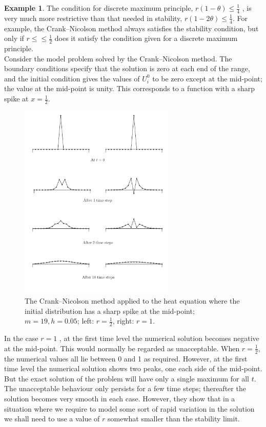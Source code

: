 \documentclass[a4paper,twoside]{ctexart}
\theoremstyle{definition}
\newtheorem{example}[definition]{Example}
\begin{document}
\begin{example}
	The condition for discrete maximum principle, $r(1 − \theta) \le \frac{1}{4}$ , is very much more
	restrictive than that needed in stability, $r(1 −
	2\theta) \le \frac{1}{4}$. For example, the Crank–Nicolson method always satisfies the
	stability condition, but only if $r ≤\le \frac{1}{2}$ does it satisfy the condition given for a discrete maximum principle.\\
	Consider the model problem
	solved by the Crank–Nicolson method. The boundary conditions specify
	that the solution is zero at each end of the range, and the initial condition gives the values of $U_i^0$ to be zero except at the mid-point; the value at
	the mid-point is unity. This corresponds to a function with a sharp spike
	at $x = \frac{1}{2}$.
	\begin{figure}[!htp]                                                                       
		\centering                                                                                                                  
		\includegraphics[width=7.4cm]{F3.png}                                           
		\caption*{The Crank–Nicolson method applied to the heat
			equation where the initial distribution has a sharp spike at the mid-point; $m = 19, h = 0.05$; left: $r = \frac{1}{2}$, right: $r = 1$.}                        
	\end{figure}
	
	\noindent In the case $r = 1$ , at the first time level the numerical solution becomes negative
	at the mid-point. This would normally be regarded as unacceptable. When $r = \frac{1}{2}$, the numerical values all lie between 0 and 1 as required. However, at the first time level the numerical solution shows two peaks, one each side of the mid-point. But the
	exact solution of the problem will have only a single maximum for all $t$.\\
	 The unacceptable behaviour only persists for a few time steps; thereafter the solution
	becomes very smooth in each case. However, they show that in a situation where we require to model some sort of rapid variation in the solution we shall need to use a value of $r$ somewhat smaller than the stability limit.
\end{example}
\end{document}

